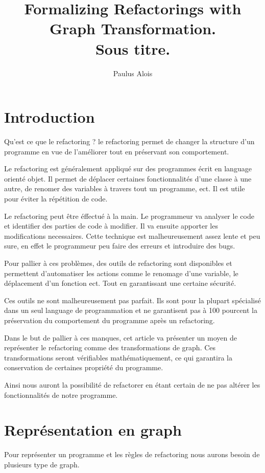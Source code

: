 \documentclass[a4paper, 10pt]{article}
\title{Formalizing Refactorings with Graph Transformation.\\
Sous titre.}
\author{Paulus Alois}
\begin{document}
\maketitle

\tableofcontents

\newpage

\section{Introduction}

Qu'est ce que le refactoring ? le refactoring permet de changer la structure d'un programme en vue de l'améliorer
tout en préservant son comportement. 

Le refactoring est généralement appliqué sur des programmes écrit en language orienté objet. Il permet de déplacer certaines fonctionnalités d'une classe à une autre, de renomer des variables à travers tout un programme, ect. Il est utile pour éviter la répétition de code.

Le refactoring peut être éffectué à la main. Le programmeur va analyser le code et identifier des parties de code à modifier. Il va ensuite apporter les modifications necessaires.
Cette technique est malheureusement assez lente et peu sure, en effet le programmeur peu faire des erreurs et introduire des bugs.

Pour pallier à ces problèmes, des outils de refactoring sont disponibles et permettent d'automatiser les actions comme le renomage d'une variable, le déplacement d'un fonction ect. Tout en garantissant une certaine sécurité.

Ces outils ne sont malheureusement pas parfait. Ils sont pour la plupart spécialisé dans un seul language de programmation et ne garantisent pas à 100 pourcent la préservation du comportement du programme après un refactoring.

Dans le but de pallier à ces manques, cet article va présenter un moyen de représenter le refactoring comme des transformations de graph. Ces transformations seront vérifiables mathématiquement, ce qui garantira la conservation de certaines propriété du programme.

Ainsi nous auront la possibilité de refactorer en étant certain de ne pas altérer les fonctionnalités de notre programme.

\section{Représentation en graph}
Pour représenter un programme et les règles de refactoring nous aurons besoin de plusieurs type de graph.
\end{document}
